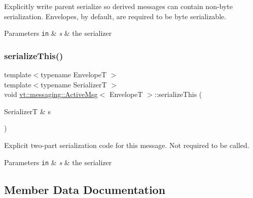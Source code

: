 Explicitly write parent serialize so derived messages can contain non-\/byte serialization. Envelopes, by default, are required to be byte serializable. 


\begin{DoxyParams}[1]{Parameters}
\mbox{\tt in}  & {\em s} & the serializer \\
\hline
\end{DoxyParams}
\mbox{\label{structvt_1_1messaging_1_1_active_msg_abd53a03d9c35dde3eadebbd8557a78e0}} 
\subsubsection{\texorpdfstring{serialize\+This()}{serializeThis()}}
{\footnotesize\ttfamily template$<$typename EnvelopeT $>$ \\
template$<$typename SerializerT $>$ \\
void \hyperlink{structvt_1_1messaging_1_1_active_msg}{vt\+::messaging\+::\+Active\+Msg}$<$ EnvelopeT $>$\+::serialize\+This (\begin{DoxyParamCaption}\item[{SerializerT \&}]{s }\end{DoxyParamCaption})\hspace{0.3cm}{\ttfamily [inline]}}



Explicit two-\/part serialization code for this message. Not required to be called. 


\begin{DoxyParams}[1]{Parameters}
\mbox{\tt in}  & {\em s} & the serializer \\
\hline
\end{DoxyParams}


\subsection{Member Data Documentation}
\mbox{\label{structvt_1_1messaging_1_1_active_msg_ae3f8937b2c95f548f1a3c3340b887c09}} 
